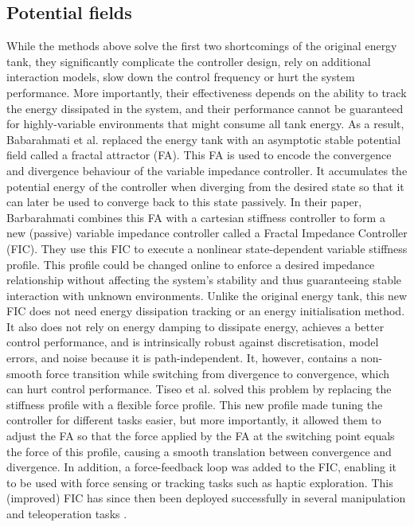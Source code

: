 \subsection{Potential fields}

While the methods above solve the first two shortcomings of the original energy tank, they significantly complicate the controller design, rely on additional interaction models, slow down the control frequency or hurt the system performance. More importantly, their effectiveness depends on the ability to track the energy dissipated in the system, and their performance cannot be guaranteed for highly-variable environments that might consume all tank energy. As a result, Babarahmati et al. \cite{babarahmatiFractalImpedancePassive2021} replaced the energy tank with an asymptotic stable potential field called a fractal attractor (FA). This FA is used to encode the convergence and divergence behaviour of the variable impedance controller. It accumulates the potential energy of the controller when diverging from the desired state so that it can later be used to converge back to this state passively. In their paper, Barbarahmati combines this FA with a cartesian stiffness controller to form a new (passive) variable impedance controller called a Fractal Impedance Controller (FIC). They use this FIC to execute a nonlinear state-dependent variable stiffness profile. This profile could be changed online to enforce a desired impedance relationship without affecting the system's stability and thus guaranteeing stable interaction with unknown environments. Unlike the original energy tank, this new FIC does not need energy dissipation tracking or an energy initialisation method. It also does not rely on energy damping to dissipate energy, achieves a better control performance, and is intrinsically robust against discretisation, model errors, and noise because it is path-independent. It, however, contains a non-smooth force transition while switching from divergence to convergence, which can hurt control performance. Tiseo et al. solved this problem by replacing the stiffness profile with a flexible force profile. This new profile made tuning the controller for different tasks easier, but more importantly, it allowed them to adjust the FA so that the force applied by the FA at the switching point equals the force of this profile, causing a smooth translation between convergence and divergence. In addition, a force-feedback loop was added to the FIC, enabling it to be used with force sensing or tracking tasks such as haptic exploration. This (improved) FIC has since then been deployed successfully in several manipulation and teleoperation tasks \cite{tiseoRobustImpedanceControl2022,tiseoFineManipulationDynamic2022,tiseoAchievingDexterousBidirectional2022,tiseoGeometricalPosturalOptimisation2022,babarahmatiRobustHighTransparencyHaptic2021,tiseoSafeCompliantControl2020}.

